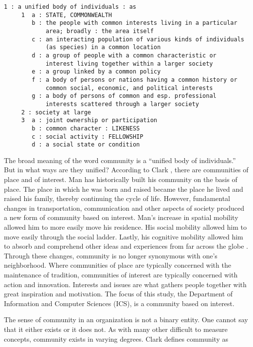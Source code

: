 \begin{verbatim}
1 : a unified body of individuals : as
     1  a : STATE, COMMONWEALTH
        b : the people with common interests living in a particular 
            area; broadly : the area itself
        c : an interacting population of various kinds of individuals
            (as species) in a common location
        d : a group of people with a common characteristic or
            interest living together within a larger society
        e : a group linked by a common policy
        f : a body of persons or nations having a common history or
            common social, economic, and political interests
        g : a body of persons of common and esp. professional 
            interests scattered through a larger society
     2 : society at large
     3  a : joint ownership or participation
        b : common character : LIKENESS
        c : social activity : FELLOWSHIP
        d : a social state or condition 
\end{verbatim}

The broad meaning of the word community is a ``unified body of individuals.''
But in what ways are they unified?  According to Clark \cite{Clark77}, there
are communities of place and of interest.  Man has historically built his
community on the basis of place.  The place in which he was born and raised
became the place he lived and raised his family, thereby continuing the cycle
of life.  However, fundamental changes in transportation, communication and
other aspects of society produced a new form of community based on interest.
Man's increase in spatial mobility allowed him to more easily move his
residence.  His social mobility allowed him to move easily through the social
ladder.  Lastly, his cognitive mobility allowed him to absorb and comprehend
other ideas and experiences from far across the globe \cite{Clark77}.  Through
these changes, community is no longer synonymous with one's neighborhood.
Where communities of place are typically concerned with the maintenance of
tradition, communities of interest are typically concerned with action and
innovation.  Interests and issues are what gathers people together with great
inspiration and motivation.  The focus of this study, the Department of
Information and Computer Sciences (ICS), is a community based on interest.

The sense of community in an organization is not a binary entity.  One cannot
say that it either exists or it does not.  As with many other difficult to
measure concepts, community exists in varying degrees.  Clark \cite{Clark73}
defines community as

